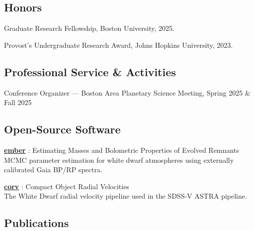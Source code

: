 \documentclass[12pt,letterpaper]{article}
\begin{document}
\subsection{Honors}
\begin{list}{}{\cvlist}

  \item Graduate Research Fellowship, Boston University, 2025.
  \item Provost's Undergraduate Research Award, Johns Hopkins University, 2023.

\end{list}


\subsection{Professional Service \& Activities}
\begin{list}{}{\cvlist}
  \item Conference Organizer --- Boston Area Planetary Science Meeting, Spring 2025 \& Fall 2025
\end{list}

\subsection{Open-Source Software}
\begin{list}{}{\cvlist}
  \item  \href{https://github.com/stefanarseneau/ember}{{\bf ember}} : Estimating Masses and Bolometric Properties of Evolved Remnants  \\
MCMC parameter estimation for white dwarf atmospheres using externally calibrated Gaia BP/RP spectra.
  \item  \href{https://github.com/vedantchandra/corv}{{\bf corv}} : Compact Object Radial Velocities  \\
The White Dwarf radial velocity pipeline used in the SDSS-V ASTRA pipeline.
\end{list}

\subsection{Publications}
\end{document}
